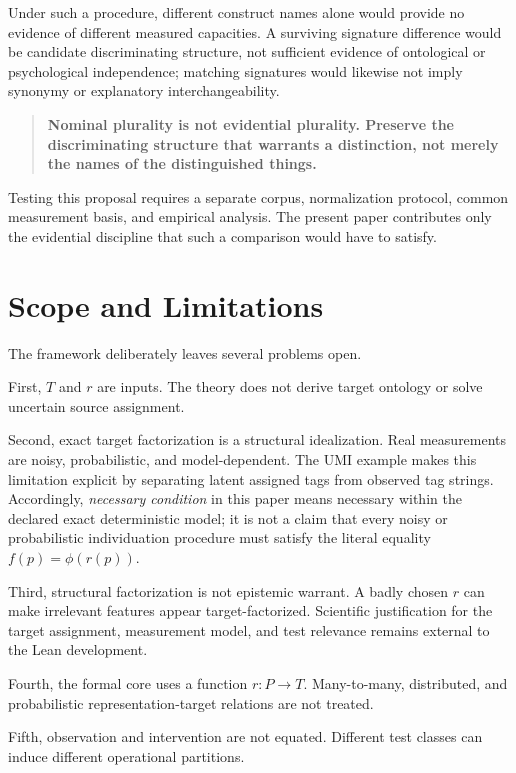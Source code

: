 \documentclass[12pt]{article}
\begin{document}
Under such a procedure, different construct names alone would provide no evidence of different measured capacities. A surviving signature difference would be candidate discriminating structure, not sufficient evidence of ontological or psychological independence; matching signatures would likewise not imply synonymy or explanatory interchangeability.

\begin{quote}
\textbf{Nominal plurality is not evidential plurality. Preserve the discriminating structure that warrants a distinction, not merely the names of the distinguished things.}
\end{quote}

Testing this proposal requires a separate corpus, normalization protocol, common measurement basis, and empirical analysis. The present paper contributes only the evidential discipline that such a comparison would have to satisfy.

\section{Scope and Limitations}

The framework deliberately leaves several problems open.

First, \(T\) and \(r\) are inputs. The theory does not derive target ontology or solve uncertain source assignment.

Second, exact target factorization is a structural idealization. Real measurements are noisy, probabilistic, and model-dependent. The UMI example makes this limitation explicit by separating latent assigned tags from observed tag strings. Accordingly, \emph{necessary condition} in this paper means necessary within the declared exact deterministic model; it is not a claim that every noisy or probabilistic individuation procedure must satisfy the literal equality \(f(p)=\phi(r(p))\).

Third, structural factorization is not epistemic warrant. A badly chosen \(r\) can make irrelevant features appear target-factorized. Scientific justification for the target assignment, measurement model, and test relevance remains external to the Lean development.

Fourth, the formal core uses a function \(r:P\to T\). Many-to-many, distributed, and probabilistic representation-target relations are not treated.

Fifth, observation and intervention are not equated. Different test classes can induce different operational partitions.
\end{document}
